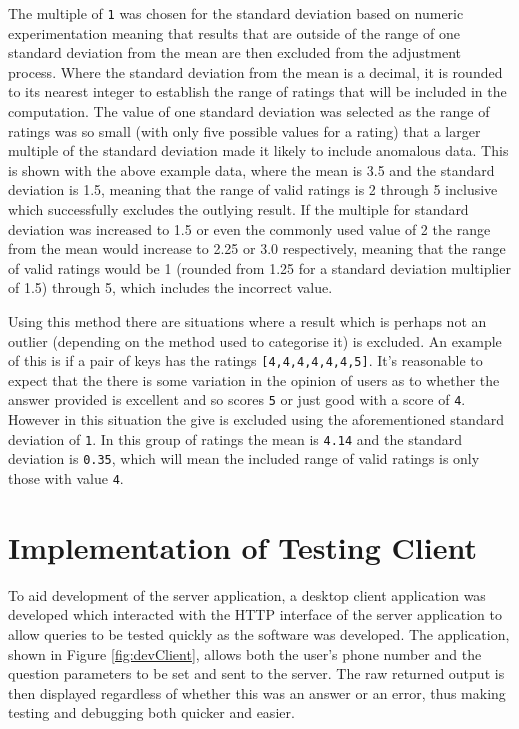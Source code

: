 \documentclass[authoryearcitations]{UoYCSproject}
\begin{document}
The multiple of \texttt{1} was chosen for the standard deviation based on numeric experimentation meaning that results that are outside of the range of one standard deviation from the mean are then excluded from the adjustment process. Where the standard deviation from the mean is a decimal, it is rounded to its nearest integer to establish the range of ratings that will be included in the computation. The value of one standard deviation was selected as the range of ratings was so small (with only five possible values for a rating) that a larger multiple of the standard deviation made it likely to include anomalous data. This is shown with the above example data, where the mean is 3.5 and the standard deviation is 1.5, meaning that the range of valid ratings is 2 through 5 inclusive which successfully excludes the outlying result. If the multiple for standard deviation was increased to 1.5 or even the commonly used value of 2 the range from the mean would increase to 2.25 or 3.0 respectively, meaning that the range of valid ratings would be 1 (rounded from 1.25 for a standard deviation multiplier of 1.5) through 5, which includes the incorrect value.

Using this method there are situations where a result which is perhaps not an outlier (depending on the method used to categorise it) is excluded. An example of this is if a pair of keys has the ratings \texttt{[4,4,4,4,4,4,5]}. It's reasonable to expect that the there is some variation in the opinion of users as to whether the answer provided is excellent and so scores \texttt{5} or just good with a score of \texttt{4}.  However in this situation the give is excluded using the aforementioned standard deviation of \texttt{1}. In this group of ratings the mean is \texttt{4.14} and the standard deviation is \texttt{0.35}, which will mean the included range of valid ratings is only those with value \texttt{4}.

\section{Implementation of Testing Client}
\label{sec:implementationTestingClient}
To aid development of the server application, a desktop client application was developed which interacted with the HTTP interface of the server application to allow queries to be tested quickly as the software was developed. The application, shown in Figure \ref{fig:devClient}, allows both the user's phone number and the question parameters to be set and sent to the server. The raw returned output is then displayed regardless of whether this was an answer or an error, thus making testing and debugging both quicker and easier. 
\end{document}
